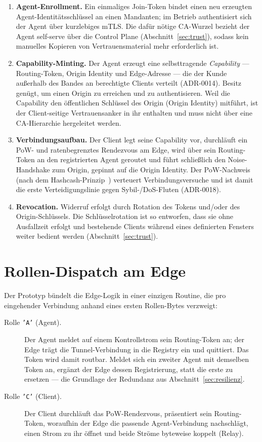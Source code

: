 \begin{enumerate}
  \item \textbf{Agent-Enrollment.} Ein einmaliges Join-Token bindet einen neu
    erzeugten Agent-Identitätsschlüssel an einen Mandanten; im Betrieb
    authentisiert sich der Agent über kurzlebiges mTLS. Die dafür nötige
    CA-Wurzel bezieht der Agent self-serve über die Control Plane
    (Abschnitt~\ref{sec:trust}), sodass kein manuelles Kopieren von
    Vertrauensmaterial mehr erforderlich ist.
  \item \textbf{Capability-Minting.} Der Agent erzeugt eine selbsttragende
    \emph{Capability} --- Routing-Token, Origin Identity und Edge-Adresse ---
    die der Kunde außerhalb des Bandes an berechtigte Clients verteilt
    (ADR-0014). Besitz genügt, um einen Origin zu erreichen und zu
    authentisieren. Weil die Capability den öffentlichen Schlüssel des Origin
    (Origin Identity) mitführt, ist der Client-seitige Vertrauensanker in ihr
    enthalten und muss nicht über eine CA-Hierarchie hergeleitet werden.
  \item \textbf{Verbindungsaufbau.} Der Client legt seine Capability vor,
    durchläuft ein PoW- und ratenbegrenztes Rendezvous am Edge, wird über sein
    Routing-Token an den registrierten Agent geroutet und führt schließlich den
    Noise-Handshake zum Origin, gepinnt auf die Origin Identity. Der
    PoW-Nachweis (nach dem Hashcash-Prinzip~\cite{back2002hashcash}) verteuert
    Verbindungsversuche und ist damit die erste Verteidigungslinie gegen
    Sybil-/DoS-Fluten (ADR-0018).
  \item \textbf{Revocation.} Widerruf erfolgt durch Rotation des Tokens
    und/oder des Origin-Schlüssels. Die Schlüsselrotation ist so entworfen, dass
    sie ohne Ausfallzeit erfolgt und bestehende Clients während eines
    definierten Fensters weiter bedient werden
    (Abschnitt~\ref{sec:trust}).
\end{enumerate}

\section{Rollen-Dispatch am Edge}
\label{sec:dispatch}

Der Prototyp bündelt die Edge-Logik in einer einzigen Routine, die pro
eingehender Verbindung anhand eines ersten Rollen-Bytes verzweigt:

\begin{description}
  \item[Rolle \texttt{'A'} (Agent).] Der Agent meldet auf einem Kontrollstrom
    sein Routing-Token an; der Edge trägt die Tunnel-Verbindung in die
    Registry ein und quittiert. Das Token wird damit routbar. Meldet sich ein
    zweiter Agent mit demselben Token an, ergänzt der Edge dessen Registrierung,
    statt die erste zu ersetzen --- die Grundlage der Redundanz aus
    Abschnitt~\ref{sec:resilienz}.
  \item[Rolle \texttt{'C'} (Client).] Der Client durchläuft das
    PoW-Rendezvous, präsentiert sein Routing-Token, woraufhin der Edge die
    passende Agent-Verbindung nachschlägt, einen Strom zu ihr öffnet und beide
    Ströme byteweise koppelt (Relay).
\end{description}

